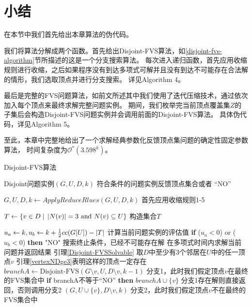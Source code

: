\section{小结}

在本节中我们首先给出本章算法的伪代码。

我们将算法分解成两个函数。首先给出Disjoint-FVS算法，如\ref{disjoint-fvs-algorithm}节所描述的这是一个分支搜索算法。
每次进入递归函数，首先应用收缩规则进行收缩，之后如果程序没有到达多项式可解并且没有到达不可能存在合法解的情形，我们选取顶点并进行分支搜索。
详见Algorithm 4。


最后是完整的FVS问题算法，如前文所述其中我们使用了迭代压缩技术，通过依次加入每个顶点来最终求解完整问题实例。
期间，我们枚举完当前顶点覆盖集$Z$的子集后会构造Disjoint-FVS问题实例并会调用前面的Disjoint-FVS算法。
具体伪代码，详见Algorithm 5。


至此，本章中完整地给出了一个求解经典参数化反馈顶点集问题的确定性固定参数算法，
时间复杂度为$\mathcal{O}^*(3.598^k)$。
\begin{algorithm}
\caption{Disjoint-FVS算法}
\begin{algorithmic}[1]
\Require Disjoint问题实例$(G,U, D, k)$
\Ensure  符合条件的问题实例反馈顶点集合或者 “NO”
\algrule
{}
    
    \State $G, U, D, k \gets ApplyReduceRlues(G, U, D, k)$ 
    \State \Comment 首先应用收缩规则1-5
    
    \State $T \gets \{v \in D\;|\;\left\vert N(v) \right\vert = 3 \text{ and } N(v) \subseteq U\}$
    \State \Comment 构造集合$T$
    
    \State $u_a \gets k, u_b \gets k + \frac{1}{2}cc(G[U]) - \left\vert T \right\vert$
    \State \Comment 计算当前问题实例的评估值
    \State \textbf{if} ($u_a < 0$) or ($u_b < 0$) \textbf{then} \Return "NO" 
    \State \Comment 搜索终止条件，已经不可能存在解
        \State 在多项式时间内求解当前问题并返回结果 \Comment 引理\ref{Disjoint-FVSSolvable}
    \Else
        \State 取$D$中至少有3个邻居在$U$中的任一顶点$v$
        \State \Comment 引理\ref{vertexNDge3}表明这样的顶点一定存在
        \State $branchA \gets \text{Disjoint-FVS}(G \setminus v, U, D \setminus v, k - 1)$
        \State \Comment 分支1，此时我们假定顶点$v$在最终的FVS集合中
        \State \textbf{if} branchA不等于“NO” \textbf{then} \Return $branchA \cup \{v\}$
        \State \Comment 分支1存在解则直接返回，否则调用分支2
        \State \Return {}$(G, U\cup\{v\}, D \setminus v, k)$
        \State \Comment 分支2，此时我们假定顶点$v$不在最终的FVS集合中
    \EndIf
\EndFunction
\end{algorithmic}
\end{algorithm}

